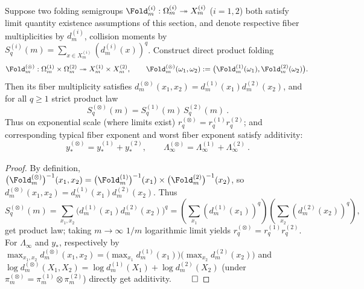 \begin{proposition}\label{prop:pom-product-fold-additivity}
Suppose two folding semigroups \(\Fold_m^{(i)}:\Omega_m^{(i)}\twoheadrightarrow X_m^{(i)}\) (\(i=1,2\)) both satisfy limit quantity existence assumptions of this section, and denote respective fiber multiplicities by \(d_m^{(i)}\), collision moments by \(S_q^{(i)}(m)=\sum_{x\in X_m^{(i)}}(d_m^{(i)}(x))^q\).
Construct direct product folding
\[
\Fold_m^{(\otimes)}:\Omega_m^{(1)}\times\Omega_m^{(2)}\twoheadrightarrow X_m^{(1)}\times X_m^{(2)},
\qquad
\Fold_m^{(\otimes)}(\omega_1,\omega_2):=\bigl(\Fold_m^{(1)}(\omega_1),\Fold_m^{(2)}(\omega_2)\bigr).
\]
Then its fiber multiplicity satisfies \(d_m^{(\otimes)}(x_1,x_2)=d_m^{(1)}(x_1)d_m^{(2)}(x_2)\), and for all \(q\ge 1\) strict product law
\[
\boxed{\ S_q^{(\otimes)}(m)=S_q^{(1)}(m)\,S_q^{(2)}(m)\ }.
\]
Thus on exponential scale (where limits exist) \(r_q^{(\otimes)}=r_q^{(1)}r_q^{(2)}\);
and corresponding typical fiber exponent and worst fiber exponent satisfy additivity:
\[
\boxed{\ y_\ast^{(\otimes)}=y_\ast^{(1)}+y_\ast^{(2)},\qquad \Lambda_\infty^{(\otimes)}=\Lambda_\infty^{(1)}+\Lambda_\infty^{(2)}\ }.
\]
\end{proposition}
\begin{proof}
By definition,
\(
\bigl(\Fold_m^{(\otimes)}\bigr)^{-1}(x_1,x_2)=\bigl(\Fold_m^{(1)}\bigr)^{-1}(x_1)\times \bigl(\Fold_m^{(2)}\bigr)^{-1}(x_2)
\),
so \(d_m^{(\otimes)}(x_1,x_2)=d_m^{(1)}(x_1)d_m^{(2)}(x_2)\).
Thus
\[
S_q^{(\otimes)}(m)
=\sum_{x_1,x_2}\bigl(d_m^{(1)}(x_1)d_m^{(2)}(x_2)\bigr)^q
=\left(\sum_{x_1}(d_m^{(1)}(x_1))^q\right)\left(\sum_{x_2}(d_m^{(2)}(x_2))^q\right),
\]
get product law; taking \(m\to\infty\) \(1/m\) logarithmic limit yields \(r_q^{(\otimes)}=r_q^{(1)}r_q^{(2)}\).
For \(\Lambda_\infty\) and \(y_\ast\), respectively by
\(
\max_{x_1,x_2}d_m^{(\otimes)}(x_1,x_2)=\bigl(\max_{x_1}d_m^{(1)}(x_1)\bigr)\bigl(\max_{x_2}d_m^{(2)}(x_2)\bigr)
\)
and
\(
\log d_m^{(\otimes)}(X_1,X_2)=\log d_m^{(1)}(X_1)+\log d_m^{(2)}(X_2)
\)
(under \(\pi_m^{(\otimes)}=\pi_m^{(1)}\otimes\pi_m^{(2)}\)) directly get additivity. $\qed$
\end{proof}

